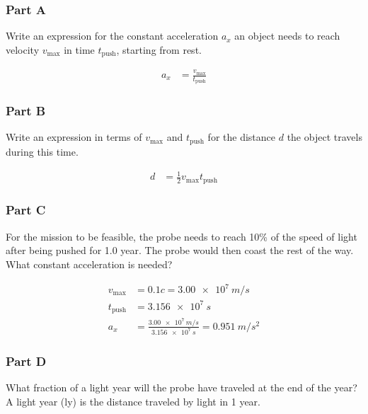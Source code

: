 \subsubsection{Part A}
Write an expression for the constant acceleration $a_x$ an object needs to reach velocity $v_{\mathrm{max}}$ in time $t_{\mathrm{push}}$, starting from rest.

\begin{solution}
	\begin{align*}
		a_x &= \frac{v_{\mathrm{max}}}{t_{\mathrm{push}}}
	\end{align*}
\end{solution}

\subsubsection{Part B}
Write an expression in terms of $v_{\mathrm{max}}$ and $t_{\mathrm{push}}$ for the distance $d$ the object travels during this time.

\begin{solution}
	\begin{align*}
		d &= \frac{1}{2} v_{\mathrm{max}} t_{\mathrm{push}}
	\end{align*}
\end{solution}

\subsubsection{Part C}
For the mission to be feasible, the probe needs to reach 10\% of the speed of light after being pushed for 1.0 year. The probe would then coast the rest of the way. What constant acceleration is needed?

\begin{solution}
	\begin{align*}
		v_{\mathrm{max}} &= 0.1c = \SI{3.00e7}{m/s} \\
		t_{\mathrm{push}} &= \SI{3.156e7}{s} \\
		a_x &= \frac{\SI{3.00e7}{m/s}}{\SI{3.156e7}{s}} = \SI{0.951}{m/s^2}
	\end{align*}
\end{solution}

\subsubsection{Part D}
What fraction of a light year will the probe have traveled at the end of the year? A light year (ly) is the distance traveled by light in 1 year.

